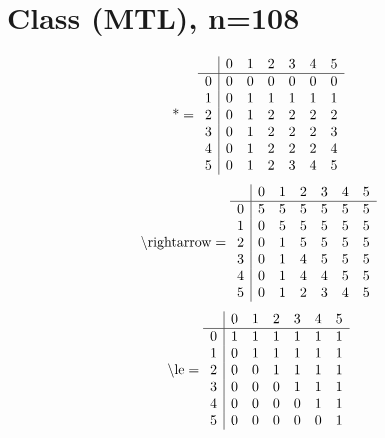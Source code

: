 \documentclass[11pt]{article}
\begin{document}
\section{Class (MTL), n=108}
\[\text{*} = 
\begin{array}{r | r r r r r r}
 & 0 & 1 & 2 & 3 & 4 & 5 \\ \hline
0 & 0 & 0 & 0 & 0 & 0 & 0 \\
1 & 0 & 1 & 1 & 1 & 1 & 1 \\
2 & 0 & 1 & 2 & 2 & 2 & 2 \\
3 & 0 & 1 & 2 & 2 & 2 & 3 \\
4 & 0 & 1 & 2 & 2 & 2 & 4 \\
5 & 0 & 1 & 2 & 3 & 4 & 5 \\
\end{array}
\]
\[\text{\textbackslash rightarrow} = 
\begin{array}{r | r r r r r r}
 & 0 & 1 & 2 & 3 & 4 & 5 \\ \hline
0 & 5 & 5 & 5 & 5 & 5 & 5 \\
1 & 0 & 5 & 5 & 5 & 5 & 5 \\
2 & 0 & 1 & 5 & 5 & 5 & 5 \\
3 & 0 & 1 & 4 & 5 & 5 & 5 \\
4 & 0 & 1 & 4 & 4 & 5 & 5 \\
5 & 0 & 1 & 2 & 3 & 4 & 5 \\
\end{array}
\]
\[\text{\textbackslash le} = 
\begin{array}{r | r r r r r r}
 & 0 & 1 & 2 & 3 & 4 & 5 \\ \hline
0 & 1 & 1 & 1 & 1 & 1 & 1 \\
1 & 0 & 1 & 1 & 1 & 1 & 1 \\
2 & 0 & 0 & 1 & 1 & 1 & 1 \\
3 & 0 & 0 & 0 & 1 & 1 & 1 \\
4 & 0 & 0 & 0 & 0 & 1 & 1 \\
5 & 0 & 0 & 0 & 0 & 0 & 1 \\
\end{array}
\]
\end{document}
